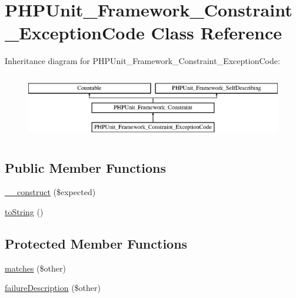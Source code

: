 \hypertarget{class_p_h_p_unit___framework___constraint___exception_code}{}\section{P\+H\+P\+Unit\+\_\+\+Framework\+\_\+\+Constraint\+\_\+\+Exception\+Code Class Reference}
\label{class_p_h_p_unit___framework___constraint___exception_code}
Inheritance diagram for P\+H\+P\+Unit\+\_\+\+Framework\+\_\+\+Constraint\+\_\+\+Exception\+Code\+:\begin{figure}[H]
\begin{center}
\leavevmode
\includegraphics[height=2.876712cm]{class_p_h_p_unit___framework___constraint___exception_code}
\end{center}
\end{figure}
\subsection*{Public Member Functions}
\begin{DoxyCompactItemize}
\item 
\mbox{\hyperlink{class_p_h_p_unit___framework___constraint___exception_code_a4432014bcb5b5900d382abfaa34d4a31}{\+\_\+\+\_\+construct}} (\$expected)
\item 
\mbox{\hyperlink{class_p_h_p_unit___framework___constraint___exception_code_a5558c5d549f41597377fa1ea8a1cefa3}{to\+String}} ()
\end{DoxyCompactItemize}
\subsection*{Protected Member Functions}
\begin{DoxyCompactItemize}
\item 
\mbox{\hyperlink{class_p_h_p_unit___framework___constraint___exception_code_a9c9c337de483bbdbb9fa249a6c7c9cc5}{matches}} (\$other)
\item 
\mbox{\hyperlink{class_p_h_p_unit___framework___constraint___exception_code_aaabb679273bfb812df4d81c283754a59}{failure\+Description}} (\$other)
\end{DoxyCompactItemize}
